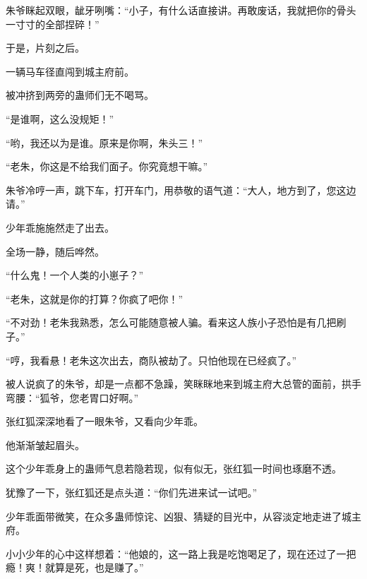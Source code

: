 \begin{this_body}
朱爷眯起双眼，龇牙咧嘴：“小子，有什么话直接讲。再敢废话，我就把你的骨头一寸寸的全部捏碎！”

于是，片刻之后。

一辆马车径直闯到城主府前。

被冲挤到两旁的蛊师们无不喝骂。

“是谁啊，这么没规矩！”

“哟，我还以为是谁。原来是你啊，朱头三！”

“老朱，你这是不给我们面子。你究竟想干嘛。”

朱爷冷哼一声，跳下车，打开车门，用恭敬的语气道：“大人，地方到了，您这边请。”

少年乖施施然走了出去。

全场一静，随后哗然。

“什么鬼！一个人类的小崽子？”

“老朱，这就是你的打算？你疯了吧你！”

“不对劲！老朱我熟悉，怎么可能随意被人骗。看来这人族小子恐怕是有几把刷子。”

“哼，我看悬！老朱这次出去，商队被劫了。只怕他现在已经疯了。”

被人说疯了的朱爷，却是一点都不急躁，笑眯眯地来到城主府大总管的面前，拱手弯腰：“狐爷，您老胃口好啊。”

张红狐深深地看了一眼朱爷，又看向少年乖。

他渐渐皱起眉头。

这个少年乖身上的蛊师气息若隐若现，似有似无，张红狐一时间也琢磨不透。

犹豫了一下，张红狐还是点头道：“你们先进来试一试吧。”

少年乖面带微笑，在众多蛊师惊诧、凶狠、猜疑的目光中，从容淡定地走进了城主府。

小小少年的心中这样想着：“他娘的，这一路上我是吃饱喝足了，现在还过了一把瘾！爽！就算是死，也是赚了。”

\end{this_body}

